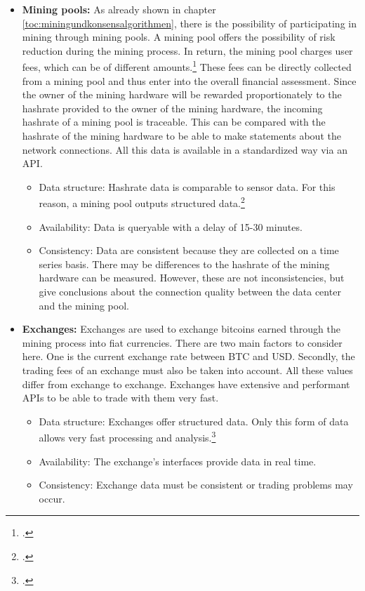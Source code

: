 \begin{itemize}
    \item \textbf{Mining pools: }As already shown in chapter \ref{toc:miningundkonsensalgorithmen}, there is the
    possibility of participating in mining through mining pools. A mining pool offers the possibility of risk reduction
    during the mining process. In return, the mining pool charges user fees, which can be of different amounts.\footcite[Cf.][pp. 59]{bhaskar2015bitcoin}
    These fees can be directly collected from a mining pool
    and thus enter into the overall financial assessment. Since the owner of the mining hardware will be rewarded proportionately
    to the hashrate provided to the owner of the mining hardware, the incoming hashrate of a mining pool is traceable.
    This can be compared with the hashrate of the mining hardware to be able to make statements about the
    network connections. All this data is available in a standardized way via an \ac{API}.
    \begin{itemize}
        \item Data structure: Hashrate data is comparable to sensor data. For this reason, a
        mining pool outputs structured data.\footcite[Cf.][p. 27]{kimble2015big}
        \item Availability: Data is queryable with a delay of 15-30 minutes.
        \item Consistency: Data are consistent because they are collected on a time series basis. There may be
        differences to the hashrate of the mining hardware can be measured. However, these are not inconsistencies, but
        give conclusions about the connection quality between the data center and the mining pool.
    \end{itemize}
    \item \textbf{Exchanges: }Exchanges are used to exchange bitcoins earned through the mining process into
    fiat currencies. There are two main factors to consider here. One is the current exchange rate
    between \ac{BTC} and \ac{USD}. Secondly, the trading fees of an exchange must also be taken into account.
    All these values differ from exchange to exchange. Exchanges have extensive and
    performant \acp{API} to be able to trade with them very fast.
    \begin{itemize}
        \item Data structure: Exchanges offer structured data. Only this form of data allows very fast
        processing and analysis.\footcite[Cf.][p. 27]{kimble2015big}
        \item Availability: The exchange's interfaces provide data in real time.
        \item Consistency: Exchange data must be consistent or trading problems may occur.
    \end{itemize}


\end{itemize}
